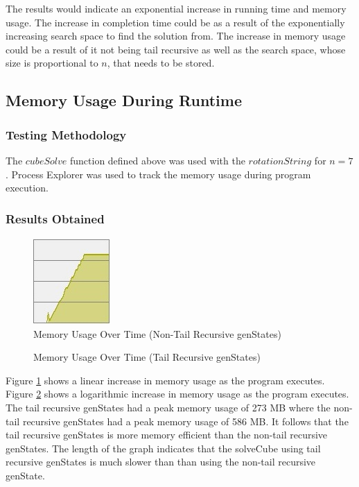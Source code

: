 \documentclass[]{article}
\begin{document}
 The results would indicate an exponential increase in running time and memory usage. The increase in completion time could be as a result of the exponentially increasing search space to find the solution from. The increase in memory usage could be a result of it not being tail recursive as well as the search space, whose size is proportional to \(n\), that needs to be stored. 
 
 \subsection{Memory Usage During Runtime}
 \subsubsection{Testing Methodology}
 The \(cubeSolve\) function defined above was used with the \(rotationString\) for \(n = 7\). Process Explorer was used to track the memory usage during program execution. 
 \subsubsection{Results Obtained}
 
 \begin{figure}[H]
 	\centering
 	\includegraphics[width=0.2\linewidth]{mem_usage2.jpg}
 	\caption{Memory Usage Over Time (Non-Tail Recursive genStates)}
 	\label{fig:memory_usage}
 \end{figure}
 
  \begin{figure}[H]
  	\centering
  	\noindent{}
  	\caption{Memory Usage Over Time (Tail Recursive genStates)}
  	\label{fig:memory_usageTail}
  \end{figure}

 Figure \ref{fig:memory_usage} shows a linear increase in memory usage as the program executes. Figure \ref{fig:memory_usageTail} shows a logarithmic increase in memory usage as the program executes. The tail recursive genStates had a peak memory usage of 273 MB where the non-tail recursive genStates had a peak memory usage of 586 MB. It follows that the tail recursive genStates is more memory efficient than the non-tail recursive genStates. The length of the graph indicates that the solveCube using tail recursive genStates is much slower than than using the non-tail recursive genState. 
\end{document}
